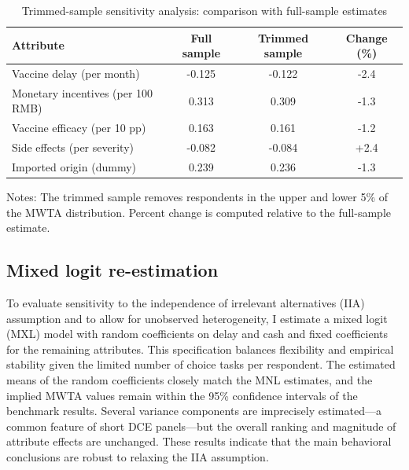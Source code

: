 \documentclass[doublespacing]{utdthesis}
\begin{document}
\begin{table}[htbp]
\centering
\caption{Trimmed-sample sensitivity analysis: comparison with full-sample estimates}
\label{tab:essay2_trimmed}
\begin{threeparttable}
\begin{tabular}{lccc}
\toprule
Attribute & Full sample & Trimmed sample & Change (\%) \\
\midrule
Vaccine delay (per month) & -0.125 & -0.122 & -2.4 \\
Monetary incentives (per 100 RMB) & 0.313 & 0.309 & -1.3 \\
Vaccine efficacy (per 10 pp) & 0.163 & 0.161 & -1.2 \\
Side effects (per severity) & -0.082 & -0.084 & +2.4 \\
Imported origin (dummy) & 0.239 & 0.236 & -1.3 \\
\bottomrule
\end{tabular}
\begin{tablenotes}
\footnotesize
\item Notes: The trimmed sample removes respondents in the upper and lower 5\% of the MWTA distribution. Percent change is computed relative to the full-sample estimate.
\end{tablenotes}
\end{threeparttable}
\end{table}

\subsection{Mixed logit re-estimation}
To evaluate sensitivity to the independence of irrelevant alternatives (IIA) assumption and to allow for unobserved heterogeneity, I estimate a mixed logit (MXL) model with random coefficients on delay and cash and fixed coefficients for the remaining attributes. This specification balances flexibility and empirical stability given the limited number of choice tasks per respondent. The estimated means of the random coefficients closely match the MNL estimates, and the implied MWTA values remain within the 95\% confidence intervals of the benchmark results. Several variance components are imprecisely estimated---a common feature of short DCE panels---but the overall ranking and magnitude of attribute effects are unchanged. These results indicate that the main behavioral conclusions are robust to relaxing the IIA assumption.
\end{document}
